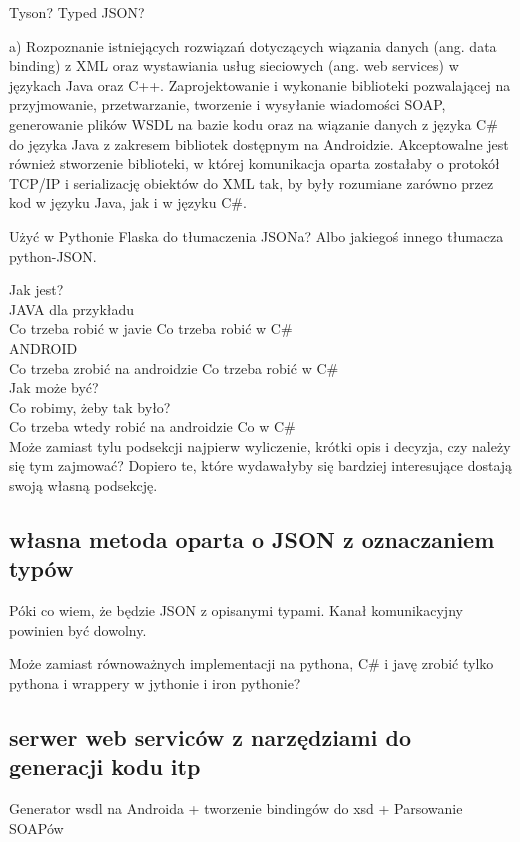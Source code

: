 Tyson? Typed JSON?

a)	Rozpoznanie istniejących rozwiązań dotyczących wiązania danych (ang. data binding) z XML oraz wystawiania usług sieciowych (ang. web services) w językach Java oraz C++.
Zaprojektowanie i wykonanie biblioteki pozwalającej na przyjmowanie, przetwarzanie, tworzenie i wysyłanie wiadomości SOAP, generowanie plików WSDL na bazie kodu oraz na wiązanie danych z języka C\# do języka Java z zakresem bibliotek dostępnym na Androidzie. Akceptowalne jest również stworzenie biblioteki, w której komunikacja oparta zostałaby o protokół TCP/IP i serializację obiektów do XML tak, by były rozumiane zarówno przez kod w języku Java, jak i w języku C\#.

Użyć w Pythonie Flaska do tłumaczenia JSONa? Albo jakiegoś innego tłumacza python-JSON.

Jak jest? \\
JAVA dla przykładu \\
Co trzeba robić w javie			Co trzeba robić w C\# \\
ANDROID \\
Co trzeba zrobić na androidzie		Co trzeba robić w C\# \\

Jak może być? \\
Co robimy, żeby tak było? \\
Co trzeba wtedy robić na androidzie	Co w C\# \\

Może zamiast tylu podsekcji najpierw wyliczenie, krótki opis i decyzja, czy należy się tym zajmować? Dopiero te, które wydawałyby się bardziej interesujące dostają swoją własną podsekcję.

\subsection{własna metoda oparta o JSON z oznaczaniem typów}
Póki co wiem, że będzie JSON z opisanymi typami. Kanał komunikacyjny powinien być dowolny. 

Może zamiast równoważnych implementacji na pythona, C\# i javę zrobić tylko pythona i wrappery w jythonie i iron pythonie?

\subsection{serwer web serviców z narzędziami do generacji kodu itp}
Generator wsdl na Androida + tworzenie bindingów do xsd + Parsowanie SOAPów

